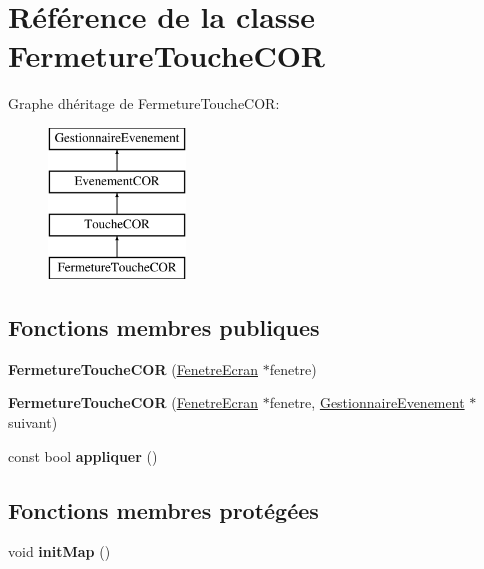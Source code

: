 \hypertarget{class_fermeture_touche_c_o_r}{}\section{Référence de la classe Fermeture\+Touche\+C\+OR}
\label{class_fermeture_touche_c_o_r}
Graphe d\textquotesingle{}héritage de Fermeture\+Touche\+C\+OR\+:\begin{figure}[H]
\begin{center}
\leavevmode
\includegraphics[height=4.000000cm]{class_fermeture_touche_c_o_r}
\end{center}
\end{figure}
\subsection*{Fonctions membres publiques}
\begin{DoxyCompactItemize}
\item 
\mbox{\label{class_fermeture_touche_c_o_r_af91c1176d128e36b96e3e07d94400019}} 
{\bfseries Fermeture\+Touche\+C\+OR} (\mbox{\hyperlink{class_fenetre_ecran}{Fenetre\+Ecran}} $\ast$fenetre)
\item 
\mbox{\label{class_fermeture_touche_c_o_r_a515a749f8bb3b725a32fd94e59445474}} 
{\bfseries Fermeture\+Touche\+C\+OR} (\mbox{\hyperlink{class_fenetre_ecran}{Fenetre\+Ecran}} $\ast$fenetre, \mbox{\hyperlink{class_gestionnaire_evenement}{Gestionnaire\+Evenement}} $\ast$suivant)
\item 
\mbox{\label{class_fermeture_touche_c_o_r_a77ff8a9c8e9c585bf084d60b43b4d37f}} 
const bool {\bfseries appliquer} ()
\end{DoxyCompactItemize}
\subsection*{Fonctions membres protégées}
\begin{DoxyCompactItemize}
\item 
\mbox{\label{class_fermeture_touche_c_o_r_a3aff286f6b7186564863c8b3889ae826}} 
void {\bfseries init\+Map} ()
\end{DoxyCompactItemize}

